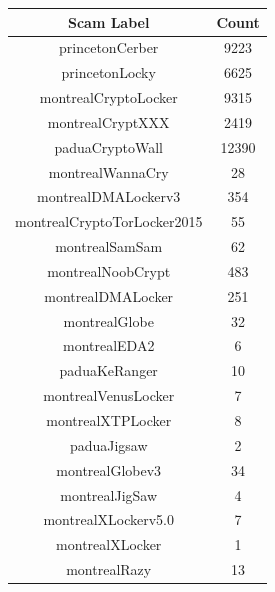 \documentclass{article}
\begin{document}
    \begin{center}
        \begin{tabular}{||c c||} 
             \hline
             \textbf{Scam Label} & \textbf{Count}  \\ [0.5ex] 
             \hline\hline
             princetonCerber & 9223  \\ 
             \hline
             princetonLocky & 6625  \\
             \hline
             montrealCryptoLocker  & 9315  \\
             \hline
             montrealCryptXXX & 2419  \\
             \hline
             paduaCryptoWall & 12390  \\ [1ex] 
             \hline
              montrealWannaCry & 28  \\ [1ex] 
             \hline
              montrealDMALockerv3 & 354  \\ [1ex] 
             \hline
              montrealCryptoTorLocker2015 & 55  \\ [1ex] 
             \hline
              montrealSamSam & 62  \\ [1ex] 
             \hline
              montrealNoobCrypt & 483  \\ [1ex] 
             \hline 
             montrealDMALocker  & 251  \\ [1ex] 
             \hline
              montrealGlobe & 32  \\ [1ex] 
             \hline
              montrealEDA2 & 6  \\ [1ex] 
             \hline
               paduaKeRanger & 10  \\ [1ex] 
             \hline
               montrealVenusLocker & 7  \\ [1ex] 
             \hline
               montrealXTPLocker & 8  \\ [1ex] 
             \hline
               paduaJigsaw & 2  \\ [1ex] 
             \hline
               montrealGlobev3 & 34  \\ [1ex] 
             \hline
               montrealJigSaw & 4  \\ [1ex] 
             \hline
               montrealXLockerv5.0 & 7  \\ [1ex] 
             \hline
               montrealXLocker & 1  \\ [1ex] 
             \hline
               montrealRazy & 13  \\ [1ex] 

\end{tabular}
\end{center}
\end{document}
